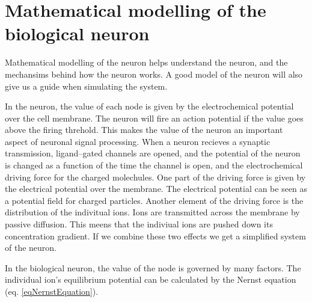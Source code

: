 
% 
% 
%

\section{Mathematical modelling of the biological neuron} 
\label{secMatematiskModelleringAvBioNeuron}


Mathematical modelling of the neuron helps understand the neuron, and the mechansims behind how the neuron works.
A good model of the neuron will also give us a guide when simulating the system.

In the neuron, the value of each node is given by the electrochemical potential over the cell membrane. 
The neuron will fire an action potential if the value goes above the firing threhold. This makes the value of the neuron an important aspect of neuronal signal processing.
When a neuron recieves a synaptic transmission, ligand--gated channels are opened, and the potential of the neuron is changed as a function of the time the channel is open, and the electrochemical driving force for the charged molechules.
One part of the driving force is given by the electrical potential over the membrane. %
The electrical potential can be seen as a potential field for charged particles.
Another element of the driving force is the distribution of the indivitual ions. Ions are transmitted across the membrane by passive diffusion. 
This meens that the indiviual ions are pushed down its concentration gradient.
If we combine these two effects we get a simplified system of the neuron.

In the biological neuron, the value of the node is governed by many factors. 
The individual ion's equilibrium potential can be calculated by the Nernst equation (eq. \ref{eqNernstEquation}).


